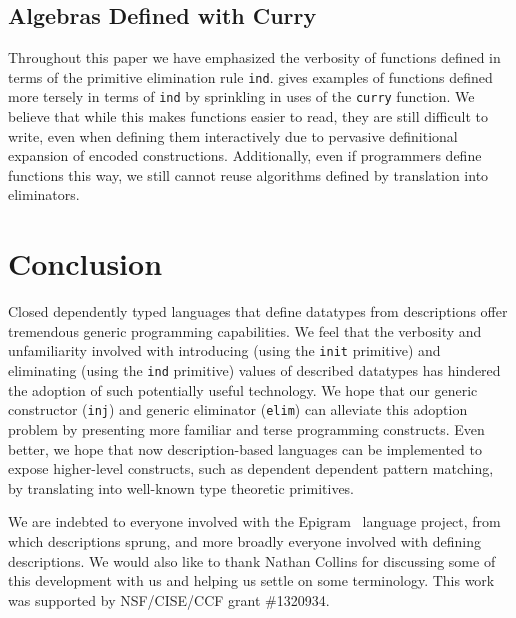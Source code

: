 \documentclass[preprint,nonatbib]{sigplanconf}
\begin{document}
\subsection{Algebras Defined with Curry}

Throughout this paper we have emphasized the verbosity of functions
defined in terms of the primitive elimination rule {\tt ind}.
\citet{mcbride2010ornamental} gives examples of functions defined more
tersely in terms of {\tt ind} by sprinkling in uses of the {\tt curry}
function. We believe that while this makes functions easier to
read, they are still difficult to write, even when defining them
interactively due to pervasive definitional expansion of encoded
constructions. Additionally, even if programmers define functions this
way, we still cannot reuse algorithms defined by translation into
eliminators.

\section{Conclusion}
\label{sec:conclusion}

Closed dependently typed languages that define datatypes from
descriptions offer tremendous generic programming capabilities. 
We feel that the verbosity and unfamiliarity involved with 
introducing (using the {\tt init} primitive)
and eliminating (using the {\tt ind} primitive)
values of described datatypes has hindered the adoption of such
potentially useful technology. We hope that our generic
constructor ({\tt inj}) and generic eliminator ({\tt elim}) can
alleviate this adoption problem by presenting more familiar and terse
programming constructs. Even better, we hope that now description-based
languages can be implemented to expose higher-level
constructs, such as dependent dependent pattern matching, by
translating into well-known type theoretic primitives.

\acks

We are indebted to everyone involved with the
{\sc Epigram}~\citep{mcbride2005epigram} language project, from which
descriptions sprung, and more broadly everyone involved with defining
descriptions.
We would also like to thank Nathan Collins for discussing some of this
development with us and helping us settle on some terminology. This
work was supported by NSF/CISE/CCF grant \#1320934.



\end{document}
